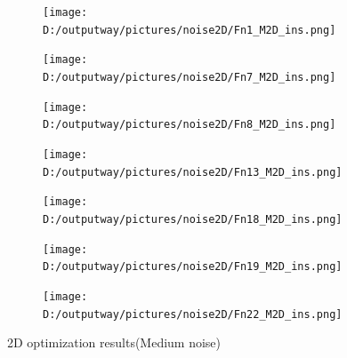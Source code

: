 \documentclass{article}
\begin{document}
\begin{figure}[H]
    \centering
    \begin{subfigure}[t]{.32\linewidth}
        \centering
        \texttt{[image: D:/outputway/pictures/noise2D/Fn1\_M2D\_ins.png]}
    \end{subfigure}
    \begin{subfigure}[t]{.32\linewidth}
        \centering
        \texttt{[image: D:/outputway/pictures/noise2D/Fn7\_M2D\_ins.png]}
    \end{subfigure}
    \begin{subfigure}[t]{.32\linewidth}
        \centering
        \texttt{[image: D:/outputway/pictures/noise2D/Fn8\_M2D\_ins.png]}
    \end{subfigure}
    \begin{subfigure}[t]{.32\linewidth}
        \centering
        \texttt{[image: D:/outputway/pictures/noise2D/Fn13\_M2D\_ins.png]}
    \end{subfigure}
    \begin{subfigure}[t]{.32\linewidth}
        \centering
        \texttt{[image: D:/outputway/pictures/noise2D/Fn18\_M2D\_ins.png]}
    \end{subfigure}
    \begin{subfigure}[t]{.32\linewidth}
        \centering
        \texttt{[image: D:/outputway/pictures/noise2D/Fn19\_M2D\_ins.png]}
    \end{subfigure}
    \begin{subfigure}[t]{.32\linewidth}
        \centering
        \texttt{[image: D:/outputway/pictures/noise2D/Fn22\_M2D\_ins.png]}
    \end{subfigure}
    \caption{2D optimization results(Medium noise)}
    \label{Fig3}
\end{figure}







\end{document}

